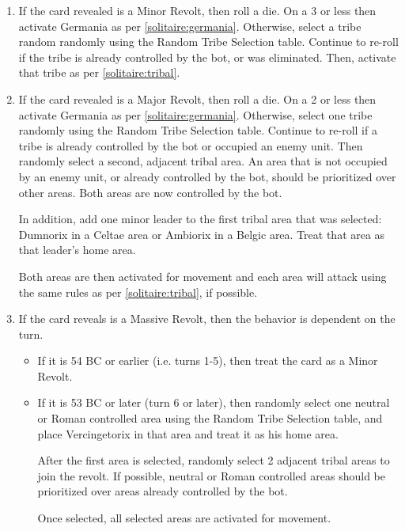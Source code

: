 \begin{enumerate}
\begin{enumerate}[leftmargin=0in]
    \item If the card revealed is a Minor Revolt, then roll a die. On a 3 or less then activate Germania as per \ref{solitaire:germania}. Otherwise, select a tribe random randomly using the Random Tribe Selection table. Continue to re-roll if the tribe is already controlled by the bot, or was eliminated. Then, activate that tribe as per \ref{solitaire:tribal}.
  
    \item If the card revealed is a Major Revolt, then roll a die. On a 2 or less then activate Germania as per \ref{solitaire:germania}. Otherwise, select one tribe randomly using the Random Tribe Selection table. Continue to re-roll if a tribe is already controlled by the bot or occupied an enemy unit. Then randomly select a second, adjacent tribal area. An area that is not occupied by an enemy unit, or already controlled by the bot, should be prioritized over other areas. Both areas are now controlled by the bot.
  
    In addition, add one minor leader to the first tribal area that was selected: Dumnorix in a Celtae area or Ambiorix in a Belgic area. Treat that area as that leader's home area.
  
    Both areas are then activated for movement and each area will attack using the same rules as per \ref{solitaire:tribal}, if possible.
  
    \item If the card reveals is a Massive Revolt, then the behavior is dependent on the turn.
    \begin{itemize}
      \item If it is 54 BC or earlier (i.e. turns 1-5), then treat the card as a Minor Revolt.
      \item \label{:solitaire:massive_revolt}If it is 53 BC or later (turn 6 or later), then randomly select one neutral or Roman controlled area using the Random Tribe Selection table, and place Vercingetorix in that area and treat it as his home area.
      
      After the first area is selected, randomly select 2 adjacent tribal areas to join the revolt. If possible, neutral or Roman controlled areas should be prioritized over areas already controlled by the bot.
      
      Once selected, all selected areas are activated for movement.
    \end{itemize}
  \end{enumerate}
  

\end{enumerate}
